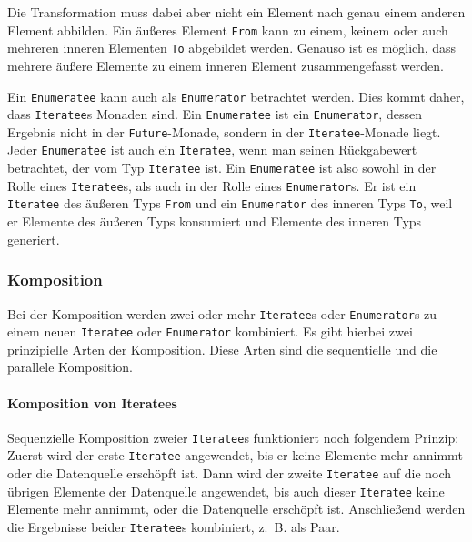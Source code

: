 \documentclass[draft=false
              ,paper=a4
              ,twoside=false
              ,fontsize=11pt
              ,headsepline
              ,BCOR10mm
              ,DIV11
              ]{scrbook}
\begin{document}
Die Transformation muss dabei aber nicht ein Element nach genau einem anderen Element abbilden.
Ein äußeres Element \lstinline|From| kann zu einem, keinem oder auch mehreren inneren Elementen \lstinline|To| abgebildet werden.
Genauso ist es möglich, dass mehrere äußere Elemente zu einem inneren Element zusammengefasst werden.

Ein \lstinline|Enumeratee| kann auch als \lstinline|Enumerator| betrachtet werden.
Dies kommt daher, dass \lstinline|Iteratee|s Monaden sind.
Ein \lstinline|Enumeratee| ist ein \lstinline|Enumerator|, dessen Ergebnis nicht in der \lstinline|Future|-Monade, sondern in der \lstinline|Iteratee|-Monade liegt.
Jeder \lstinline|Enumeratee| ist auch ein \lstinline|Iteratee|, wenn man seinen Rückgabewert betrachtet, der vom Typ \lstinline|Iteratee| ist.
Ein \lstinline|Enumeratee| ist also sowohl in der Rolle eines \lstinline|Iteratee|s, als auch in der Rolle eines \lstinline|Enumerator|s.
Er ist ein \lstinline|Iteratee| des äußeren Typs \lstinline|From| und ein \lstinline|Enumerator| des inneren Typs \lstinline|To|, weil er Elemente des äußeren Typs konsumiert und Elemente des inneren Typs generiert.



\subsubsection{Komposition} %
\label{ssub:komposition}

Bei der Komposition werden zwei oder mehr \lstinline|Iteratee|s oder \lstinline|Enumerator|s zu einem neuen \lstinline|Iteratee| oder \lstinline|Enumerator| kombiniert.
Es gibt hierbei zwei prinzipielle Arten der Komposition.
Diese Arten sind die sequentielle und die parallele Komposition.

\paragraph{Komposition von Iteratees} %
\label{par:komposition_von_iteratees}\mbox{} %

Sequenzielle Komposition zweier \lstinline|Iteratee|s funktioniert noch folgendem Prinzip:
Zuerst wird der erste \lstinline|Iteratee| angewendet, bis er keine Elemente mehr annimmt oder die Datenquelle erschöpft ist.
Dann wird der zweite \lstinline|Iteratee| auf die noch übrigen Elemente der Datenquelle angewendet, bis auch dieser \lstinline|Iteratee| keine Elemente mehr annimmt, oder die Datenquelle erschöpft ist.
Anschließend werden die Ergebnisse beider \lstinline|Iteratee|s kombiniert, z.~B. als Paar. %
\end{document}

